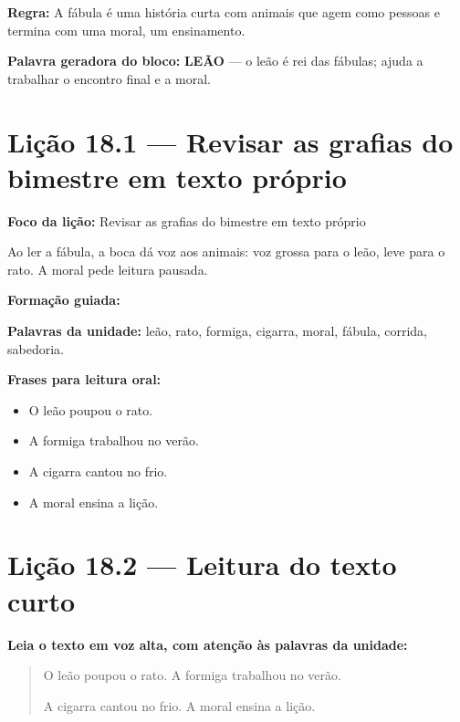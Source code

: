 \textbf{Regra:} A fábula é uma história curta com animais que agem como pessoas e termina com uma moral, um ensinamento.

\textbf{Palavra geradora do bloco:} \textbf{LEÃO} --- o leão é rei das fábulas; ajuda a trabalhar o encontro final e a moral.

\section{Lição 18.1 --- Revisar as grafias do bimestre em texto próprio}

\textbf{Foco da lição:} Revisar as grafias do bimestre em texto próprio


\begin{boquinha}
Ao ler a fábula, a boca dá voz aos animais: voz grossa para o leão, leve para o rato. A moral pede leitura pausada.
\end{boquinha}

\noindent\textbf{Formação guiada:}

\begin{center}
\end{center}

\noindent\textbf{Palavras da unidade:} leão, rato, formiga, cigarra, moral, fábula, corrida, sabedoria.

\noindent\textbf{Frases para leitura oral:}
\begin{itemize}[leftmargin=1.6em]
  \item O leão poupou o rato.
  \item A formiga trabalhou no verão.
  \item A cigarra cantou no frio.
  \item A moral ensina a lição.
\end{itemize}

\section{Lição 18.2 --- Leitura do texto curto}

\noindent\textbf{Leia o texto em voz alta, com atenção às palavras da unidade:}


\begin{quote}
O leão poupou o rato. A formiga trabalhou no verão.

A cigarra cantou no frio. A moral ensina a lição.
\end{quote}

